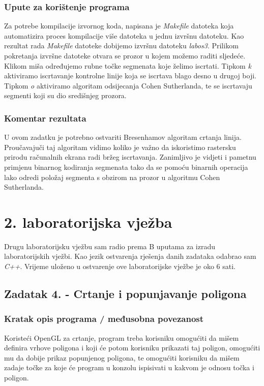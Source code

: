 \documentclass{report}
\begin{document}
\subsection{Upute za korištenje programa}
Za potrebe kompilacije izvornog koda, napisana je \textit{Makefile} datoteka koja automatizira proces kompilacije više datoteka u jednu izvršnu datoteku. Kao rezultat rada \textit{Makefile} datoteke dobijemo izvršnu datoteku \textit{labos3}. Prilikom pokretanja izvršne datoteke otvara se prozor u kojem možemo raditi sljedeće. Klikom miša određujemo rubne točke segmenata koje želimo iscrtati. Tipkom \textit{k} aktiviramo iscrtavanje kontrolne linije koja se iscrtava blago desno u drugoj boji. Tipkom \textit{o} aktiviramo algoritam odsijecanja Cohen Sutherlanda, te se iscrtavaju segmenti koji su dio središnjeg prozora.

\subsection{Komentar rezultata}
U ovom zadatku je potrebno ostvariti Bresenhamov algoritam crtanja linija. Proučavajuči taj algoritam vidimo koliko je važno da iskoristimo rastersku prirodu računalnih ekrana radi bržeg iscrtavanja. Zanimljivo je vidjeti i pametnu primjenu binarnog kodiranja segmenata tako da se pomoću binarnih operacija lako odredi položaj segmenta s obzirom na prozor u algoritmu Cohen Sutherlanda. 

\chapter{2. laboratorijska vježba}
Drugu laboratorijsku vježbu sam radio prema B uputama za izradu laboratorijskih vježbi. Kao jezik ostvarenja rješenja danih zadataka odabrao sam \textit{C++}. Vrijeme uloženo u ostvarenje ove laboratorijske vježbe je oko 6 sati. 

\section{Zadatak 4. - Crtanje i popunjavanje poligona}
\subsection{Kratak opis programa / međusobna povezanost}
Koristeći OpenGL za crtanje, program treba korisniku omogućiti da mišem definira vrhove poligona i koji će potom korisniku prikazati taj poligon, omogućiti mu da dobije prikaz popunjenog poligona, te omogućiti korisniku da mišem zadaje točke za koje će program u konzolu ispisivati u kakvom je odnosu točka i poligon.
\end{document}
